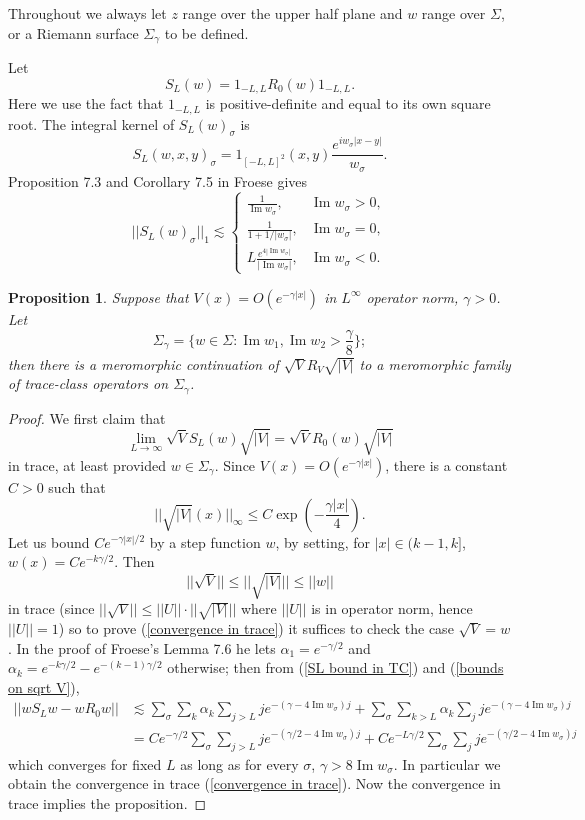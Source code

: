\documentclass[reqno,12pt,letterpaper]{amsart}
\renewcommand{\Im}{\operatorname{Im}}
\newtheorem{proposition}[theorem]{Proposition}
\theoremstyle{definition}
\begin{document}
Throughout we always let $z$ range over the upper half plane and $w$ range over $\Sigma$, or a Riemann surface $\Sigma_\gamma$ to be defined.

Let
$$S_L(w) = 1_{-L, L} R_0(w) 1_{-L, L}.$$
Here we use the fact that $1_{-L, L}$ is positive-definite and equal to its own square root.
The integral kernel of $S_L(w)_\sigma$ is
$$S_L(w, x, y)_\sigma = 1_{[-L, L]^2}(x, y) \frac{e^{iw_\sigma|x - y|}}{w_\sigma}.$$
Proposition 7.3 and Corollary 7.5 in Froese gives
\begin{equation}
\label{SL bound in TC}
||S_L(w)_\sigma||_1 \lesssim \begin{cases}
\frac{1}{\Im w_\sigma}, & \Im w_\sigma > 0,\\
\frac{1}{1 + 1/|w_\sigma|}, & \Im w_\sigma = 0,\\
L\frac{e^{4|\Im w_\sigma|}}{|\Im w_\sigma|}, & \Im w_\sigma < 0.
\end{cases}
\end{equation}
\begin{proposition}
Suppose that $V(x) = O(e^{-\gamma |x|})$ in $L^\infty$ operator norm, $\gamma > 0$. Let
$$\Sigma_\gamma = \{w \in \Sigma: \Im w_1, \Im w_2 > \frac{\gamma}{8}\};$$
then there is a meromorphic continuation of $\sqrt V R_V \sqrt{|V|}$ to a meromorphic family of trace-class operators on $\Sigma_\gamma$.
\end{proposition}
\begin{proof}
We first claim that
\begin{equation}
\label{convergence in trace}
\lim_{L \to \infty} \sqrt V S_L(w) \sqrt{|V|} = \sqrt V R_0(w) \sqrt{|V|}
\end{equation}
in trace, at least provided $w \in \Sigma_\gamma$.
Since $V(x) = O(e^{-\gamma|x|})$, there is a constant $C > 0$ such that
\begin{equation}
\label{bounds on sqrt V}
||\sqrt{|V|}(x)||_\infty \leq C\exp\left(-\frac{\gamma |x|}{4}\right).
\end{equation}
Let us bound $Ce^{-\gamma|x|/2}$ by a step function $w$, by setting, for $|x| \in (k - 1, k]$, $w(x) = Ce^{-k\gamma/2}$.
Then
$$||\sqrt V|| \leq ||\sqrt{|V|}|| \leq ||w||$$
in trace (since $||\sqrt V|| \leq ||U|| \cdot ||\sqrt{|V|}||$ where $||U||$ is in operator norm, hence $||U|| = 1$) so to prove (\ref{convergence in trace}) it suffices to check the case $\sqrt V = w$.
In the proof of Froese's Lemma 7.6 he lets $\alpha_1 = e^{-\gamma/2}$ and $\alpha_k = e^{-k\gamma/2} - e^{-(k-1)\gamma/2}$ otherwise; then from (\ref{SL bound in TC}) and (\ref{bounds on sqrt V}),
\begin{align*}||wS_Lw - wR_0w|| &\lesssim \sum_\sigma \sum_k \alpha_k \sum_{j > L} je^{-(\gamma-4 \Im w_\sigma)j} + \sum_\sigma \sum_{k > L} \alpha_k \sum_j je^{-(\gamma-4 \Im w_\sigma)j}\\
&= Ce^{-\gamma/2}\sum_\sigma \sum_{j > L} je^{-(\gamma/2 -4 \Im w_\sigma)j} + Ce^{-L\gamma/2} \sum_\sigma \sum_j je^{-(\gamma/2 -4 \Im w_\sigma)j}
\end{align*}
which converges for fixed $L$ as long as for every $\sigma$, $\gamma > 8 \Im w_\sigma$. In particular we obtain the convergence in trace (\ref{convergence in trace}).
Now the convergence in trace implies the proposition.
\end{proof}
\end{document}
